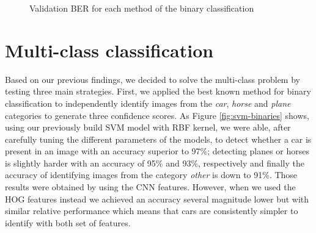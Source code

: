 \documentclass{article} %
\begin{document}
\begin{figure}
  \center
  \hfill
  \caption{Validation BER for each method of the binary classification}
  \label{fig:lambdas}
\end{figure}

\section{Multi-class classification}

Based on our previous findings, we decided to solve the multi-class problem by testing three main strategies. First, we applied the best known method for binary classification to independently identify images from the \textit{car}, \textit{horse} and \textit{plane} categories to generate three confidence scores. As Figure \ref{fig:svm-binaries} shows, using our previously build SVM model with RBF kernel, we were able, after carefully tuning the different parameters of the models, to detect whether a car is present in an image with an accuracy superior to 97\%; detecting planes or horses is slightly harder with an accuracy of 95\% and 93\%, respectively and finally the accuracy of identifying images from the category \textit{other} is down to 91\%. Those results were obtained by using the CNN features. However, when we used the HOG features instead we achieved an accuracy several magnitude lower but with similar relative performance which means that cars are consistently simpler to identify with both set of features.
\end{document}
